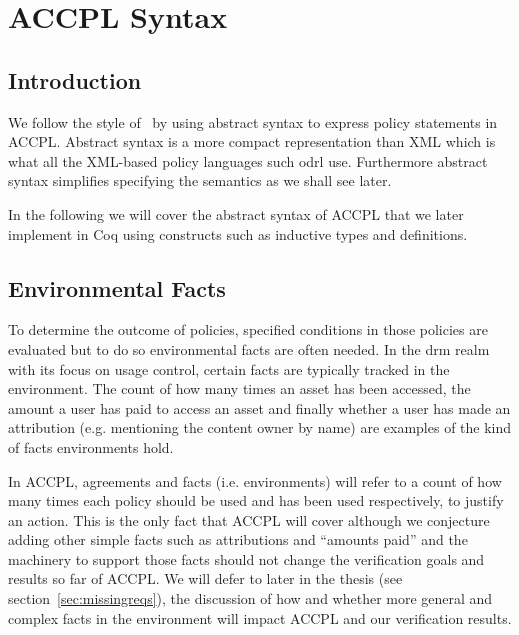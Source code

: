 \chapter{ACCPL Syntax}
\label{chap:odrl0syntax}

\section{Introduction}

We follow the style of~\cite{pucella2006} by using abstract syntax to express policy statements in \ac{ACCPL}. Abstract syntax is a more compact representation than XML which is what all the XML-based policy languages such \ac{odrl} use. Furthermore abstract syntax simplifies specifying the semantics as we shall see later. 

In the following we will cover the abstract syntax of \ac{ACCPL} that we later implement in Coq using constructs such as inductive types and definitions. 


\section{Environmental Facts}\label{sec:odrl0}
To determine the outcome of policies, specified conditions in those policies are evaluated but to do so environmental facts are often needed. In the \ac{drm} realm with its focus on usage control, certain facts are typically tracked in the environment. The count of how many times an asset has been accessed, the amount a user has paid to access an asset and finally whether a user has made an attribution (e.g. mentioning the content owner by name) are examples of the kind of facts environments hold.

In \ac{ACCPL}, agreements and facts (i.e. environments) will refer to a count of how many times each policy should be used and has been used respectively, to justify an action. This is the only fact that \ac{ACCPL} will cover although we conjecture adding other simple facts such as attributions and ``amounts paid'' and the machinery to support those facts should not change the verification goals and results so far of \ac{ACCPL}. We will defer to later in the thesis (see section~\ref{sec:missingreqs}), the discussion of how and whether more general and complex facts in the environment will impact \ac{ACCPL} and our verification results.   

